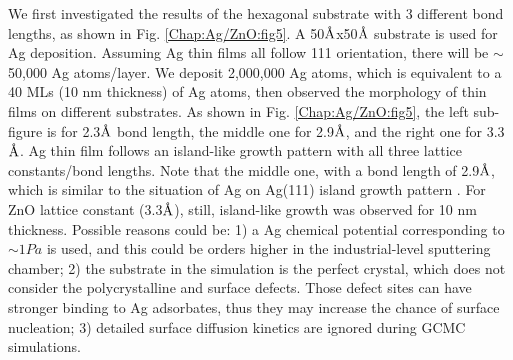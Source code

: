 We first investigated the results of the hexagonal substrate with 3 different bond lengths, as shown in Fig. \ref{Chap:Ag/ZnO:fig5}. A 50$\mbox{\normalfont\AA}$x50$\mbox{\normalfont\AA}$ substrate is used for Ag deposition. Assuming Ag thin films all follow {111} orientation, there will be $\sim$ 50,000 Ag atoms/layer. We deposit 2,000,000 Ag atoms, which is equivalent to a 40 \ac{ML}s (10 nm thickness) of Ag atoms, then observed the morphology of thin films on different substrates. As shown in Fig. \ref{Chap:Ag/ZnO:fig5}, the left sub-figure is for 2.3$\mbox{\normalfont\AA}$ bond length, the middle one for 2.9$\mbox{\normalfont\AA}$, and the right one for 3.3$\mbox{\normalfont\AA}$. Ag thin film follows an island-like growth pattern with all three lattice constants/bond lengths. Note that the middle one, with a bond length of 2.9$\mbox{\normalfont\AA}$, which is similar to the situation of Ag on Ag(111) island growth pattern \cite{li2008exploration}. For ZnO lattice constant (3.3$\mbox{\normalfont\AA}$), still, island-like growth was observed for 10 nm thickness. Possible reasons could be: 1) a Ag chemical potential corresponding to $\sim 1 Pa$ is used, and this could be orders higher in the industrial-level sputtering chamber; 2) the substrate in the simulation is the perfect crystal, which does not consider the polycrystalline and surface defects. Those defect sites can have stronger binding to Ag adsorbates, thus they may increase the chance of surface nucleation; 3) detailed surface diffusion kinetics are ignored during \ac{GCMC} simulations.

